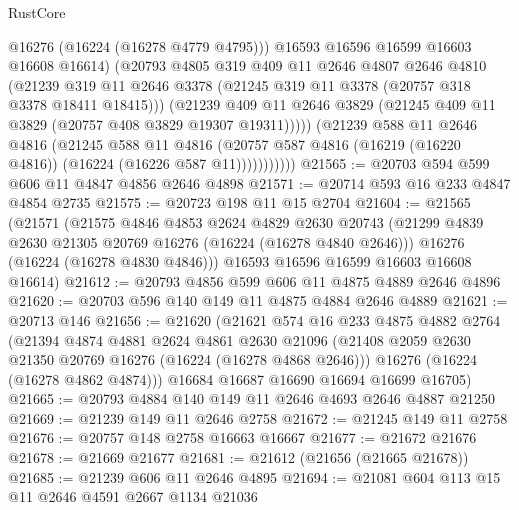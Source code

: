 \begin{lexlean}{RustCore}
\begin{coremodule}
                      @16276
                      (@16224 (@16278 @4779 @4795)))
                    @16593
                    @16596
                    @16599
                    @16603
                    @16608
                    @16614)
                  (@20793
                    @4805
                    @319
                    @409
                    @11
                    @2646
                    @4807
                    @2646
                    @4810
                    (@21239
                      @319
                      @11
                      @2646
                      @3378
                      (@21245 @319 @11 @3378 (@20757 @318 @3378 @18411 @18415)))
                    (@21239
                      @409
                      @11
                      @2646
                      @3829
                      (@21245 @409 @11 @3829 (@20757 @408 @3829 @19307 @19311)))))
                (@21239
                  @588
                  @11
                  @2646
                  @4816
                  (@21245
                    @588
                    @11
                    @4816
                    (@20757 @587 @4816 (@16219 (@16220 @4816)) (@16224 (@16226 @587 @11)))))))))))
@21565 := @20703 @594 @599 @606 @11 @4847 @4856 @2646 @4898
@21571 := @20714 @593 @16 @233 @4847 @4854 @2735
@21575 := @20723 @198 @11 @15 @2704
@21604 := @21565
    (@21571
      (@21575
        @4846
        @4853
        @2624
        @4829
        @2630
        @20743
        (@21299 @4839 @2630 @21305 @20769 @16276 (@16224 (@16278 @4840 @2646)))
        @16276
        (@16224 (@16278 @4830 @4846)))
      @16593
      @16596
      @16599
      @16603
      @16608
      @16614)
@21612 := @20793 @4856 @599 @606 @11 @4875 @4889 @2646 @4896
@21620 := @20703 @596 @140 @149 @11 @4875 @4884 @2646 @4889
@21621 := @20713 @146
@21656 := @21620
    (@21621
      @574
      @16
      @233
      @4875
      @4882
      @2764
      (@21394
        @4874
        @4881
        @2624
        @4861
        @2630
        @21096
        (@21408 @2059 @2630 @21350 @20769 @16276 (@16224 (@16278 @4868 @2646)))
        @16276
        (@16224 (@16278 @4862 @4874)))
      @16684
      @16687
      @16690
      @16694
      @16699
      @16705)
@21665 := @20793 @4884 @140 @149 @11 @2646 @4693 @2646 @4887 @21250
@21669 := @21239 @149 @11 @2646 @2758
@21672 := @21245 @149 @11 @2758
@21676 := @20757 @148 @2758 @16663 @16667
@21677 := @21672 @21676
@21678 := @21669 @21677
@21681 := @21612 (@21656 (@21665 @21678))
@21685 := @21239 @606 @11 @2646 @4895
@21694 := @21081 @604 @113 @15 @11 @2646 @4591 @2667 @1134 @21036

\end{coremodule}
\end{lexlean}
